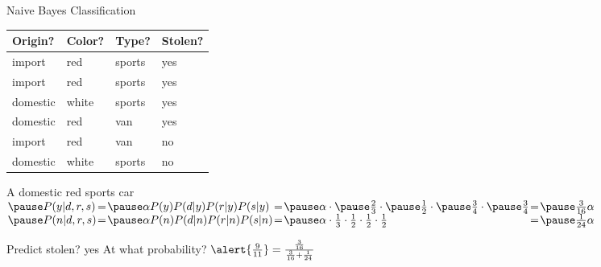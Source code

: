 \documentclass[14pt]{beamer}
\begin{document}
\begin{frame}{Naive Bayes Classification}
\centering
\begin{tabular}[t]{lll|l}
Origin?  & Color? & Type?  & Stolen? \\
\hline
import   & red    & sports & yes \\
import   & red    & sports & yes \\
domestic & white  & sports & yes \\
domestic & red    & van    & yes \\
import   & red    & van    & no \\
domestic & white  & sports & no \\
\end{tabular}

\pause
\begin{block}{A domestic red sports car}
\small
$
\begin{array}{@{}l@{\hspace{.1em}}l@{\hspace{.1em}}l@{\hspace{.1em}}l@{\hspace{.1em}}l@{\hspace{.1em}}l@{\hspace{.1em}}l@{}}
\pause
P(y|d,r,s) & = & \pause\alpha P(y)P(d|y)P(r|y)P(s|y) 
           & = & \pause\alpha\cdot\pause\frac{2}{3}\cdot\pause\frac{1}{2}\cdot\pause\frac{3}{4}\cdot\pause\frac{3}{4}
           & = & \pause\frac{3}{16}\alpha
\\
\pause
P(n|d,r,s) & = & \pause\alpha P(n)P(d|n)P(r|n)P(s|n)
           & = & \pause\alpha\cdot\frac{1}{3}\cdot\frac{1}{2}\cdot\frac{1}{2}\cdot\frac{1}{2}
           & = & \pause\frac{1}{24}\alpha
\end{array}
$
\normalsize
\medskip

\pause
Predict stolen?
\pause
\alert{yes}
\hfill
\pause
At what probability?
\pause
$\alert{\frac{9}{11}} = \frac{\frac{3}{16}}{\frac{3}{16} + \frac{1}{24}}$
\end{block}
\end{frame}
\end{document}
